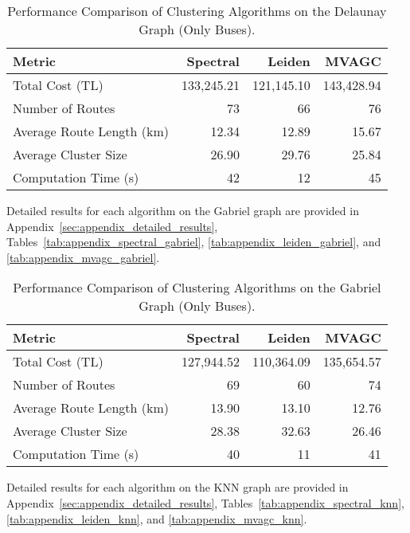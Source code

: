 \begin{table}[h]
\centering
\label{tab:delaunay_results}
\begin{tabular}{lrrr}
\toprule
Metric & Spectral & Leiden & MVAGC \\
\midrule
Total Cost (TL) & 133,245.21 & 121,145.10 & 143,428.94 \\
Number of Routes & 73 & 66 & 76 \\
Average Route Length (km) & 12.34 & 12.89 & 15.67 \\
Average Cluster Size & 26.90 & 29.76 & 25.84 \\
Computation Time (s) & 42 & 12 & 45 \\
\bottomrule
\end{tabular}
\caption{Performance Comparison of Clustering Algorithms on the Delaunay Graph (Only Buses).}
\end{table}

Detailed results for each algorithm on the Gabriel graph are provided in Appendix~\ref{sec:appendix_detailed_results}, Tables~\ref{tab:appendix_spectral_gabriel}, \ref{tab:appendix_leiden_gabriel}, and \ref{tab:appendix_mvagc_gabriel}.

\begin{table}[h]
\centering
\label{tab:gabriel_results}
\begin{tabular}{lrrr}
\toprule
Metric & Spectral & Leiden & MVAGC \\
\midrule
Total Cost (TL) & 127,944.52 & 110,364.09 & 135,654.57 \\
Number of Routes & 69 & 60 & 74 \\
Average Route Length (km) & 13.90 & 13.10 & 12.76 \\
Average Cluster Size & 28.38 & 32.63 & 26.46 \\
Computation Time (s) & 40 & 11 & 41 \\
\bottomrule
\end{tabular}
\caption{Performance Comparison of Clustering Algorithms on the Gabriel Graph (Only Buses).}
\end{table}

Detailed results for each algorithm on the KNN graph are provided in Appendix~\ref{sec:appendix_detailed_results}, Tables~\ref{tab:appendix_spectral_knn}, \ref{tab:appendix_leiden_knn}, and \ref{tab:appendix_mvagc_knn}.

